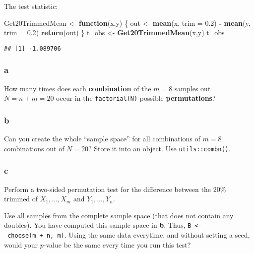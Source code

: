 \documentclass[]{article}
\newenvironment{Shaded}{\begin{snugshade}}{\end{snugshade}}
\newcommand{\ControlFlowTok}[1]{\textcolor[rgb]{0.13,0.29,0.53}{\textbf{#1}}}
\newcommand{\DataTypeTok}[1]{\textcolor[rgb]{0.13,0.29,0.53}{#1}}
\newcommand{\FloatTok}[1]{\textcolor[rgb]{0.00,0.00,0.81}{#1}}
\newcommand{\KeywordTok}[1]{\textcolor[rgb]{0.13,0.29,0.53}{\textbf{#1}}}
\newcommand{\NormalTok}[1]{#1}
\newcommand{\OperatorTok}[1]{\textcolor[rgb]{0.81,0.36,0.00}{\textbf{#1}}}
\newcommand{\StringTok}[1]{\textcolor[rgb]{0.31,0.60,0.02}{#1}}
\begin{document}
The test statistic:

\begin{Shaded}
\begin{Highlighting}[]
\NormalTok{Get20TrimmedMean <-}\StringTok{ }\ControlFlowTok{function}\NormalTok{(x,y) \{}
\NormalTok{  out <-}\StringTok{ }\KeywordTok{mean}\NormalTok{(x, }\DataTypeTok{trim =} \FloatTok{0.2}\NormalTok{) }\OperatorTok{-}\StringTok{ }\KeywordTok{mean}\NormalTok{(y, }\DataTypeTok{trim =} \FloatTok{0.2}\NormalTok{) }
  \KeywordTok{return}\NormalTok{(out)}
\NormalTok{\}}
\NormalTok{t_obs <-}\StringTok{ }\KeywordTok{Get20TrimmedMean}\NormalTok{(x,y)}
\NormalTok{t_obs}
\end{Highlighting}
\end{Shaded}

\begin{verbatim}
## [1] -1.089706
\end{verbatim}

\hypertarget{a}{%
\subsubsection{a}\label{a}}

How many times does each \textbf{combination} of the \(m = 8\) samples
out \(N = n + m = 20\) occur in the \texttt{factorial(N)} possible
\textbf{permutations}?

\hypertarget{b}{%
\subsubsection{b}\label{b}}

Can you create the whole ``sample space'' for all combinations of
\(m= 8\) combinations out of \(N= 20\)? Store it into an object. Use
\texttt{utils::combn()}.

\hypertarget{c}{%
\subsubsection{c}\label{c}}

Perform a two-sided permutation test for the difference between the 20\%
trimmed of \(X_1,...,X_m\) and \(Y_1,...,Y_n\).

Use all samples from the complete sample space (that does not contain
any doubles). You have computed this sample space in \textbf{b}. Thus,
\texttt{B\ \textless{}-\ choose(m\ +\ n,\ m)}. Using the same data
everytime, and without setting a seed, would your \(p\)-value be the
same every time you run this test?
\end{document}
